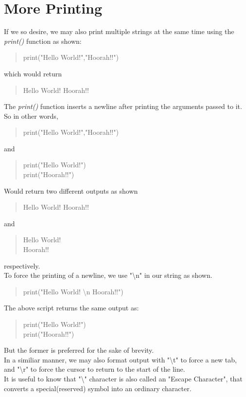 \section{More Printing}
If we so desire, we may also print multiple strings at the same time using the \emph{print()} function as shown:
\begin{quote}
print("Hello World!","Hoorah!!")
\end{quote}
which would return
\begin{quote}
Hello World! Hoorah!!
\end{quote}
The \emph{print()} function inserts a newline after printing the arguments passed to it. So in other words,
\begin{quote}
print("Hello World!","Hoorah!!")
\end{quote}
and 
\begin{quote}
print("Hello World!")\\
print("Hoorah!!")
\end{quote}
Would return two different outputs as shown
\begin{quote}
Hello World! Hoorah!!
\end{quote}
and 
\begin{quote}
Hello World!\\
Hoorah!!
\end{quote}
respectively.\\
To force the printing of a newline, we use "\textbackslash n" in our string as shown.
\begin{quote}
print("Hello World! \textbackslash n Hoorah!!")
\end{quote}
The above script returns the same output as:
\begin{quote}
print("Hello World!")\\
print("Hoorah!!")
\end{quote}
But the former is preferred for the sake of brevity.\\
In a similiar manner, we may also format output with "\textbackslash t" to force a new tab, and "\textbackslash r" to force the cursor to return to the start of the line.\\
It is useful to know that "\textbackslash" character is also called an "Escape Character", that converts a special(reserved) symbol into an ordinary character.
